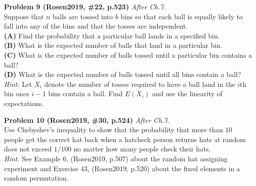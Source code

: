 \documentclass[jou]{apa6}
\begin{document}
\vspace{8pt}
{\bf Problem 9 (Rosen2019, \#22, p.523)} \textendash{} {\em After Ch.7.}\\
Suppose that $n$ balls are tossed into $b$ bins so that each 
ball is equally likely to fall into any of the bins and that the tosses are independent.\\
{\bf (A)} Find the probability that a particular ball lands in a specified bin.\\
{\bf (B)} What is the expected number of balls that land in a particular bin.\\
{\bf (C)} What is the expected number of balls tossed until a particular bin contains a ball?\\
{\bf (D)} What is the expected number of balls tossed until all bins contain a ball?\\
{\em Hint:} Let $X_i$ denote the number of tosses required to have a ball land in 
the $i$th bin once $i-1$ bins contain a ball. Find $E(X_i)$ and use the linearity of 
expectations.

\vspace{8pt}
{\bf Problem 10 (Rosen2019, \#30, p.524)} \textendash{} {\em After Ch.7.}\\
Use Chebyshev's inequality to show that the probability that more than $10$ people get the 
correct hat back when a hatcheck person returns hats at random does not exceed $1/100$
no matter how many people check their hats.\\
{\em Hint.} See Example 6, (Rosen2019, p.507) about the random hat assigning experiment 
and Exercise 43, (Rosen2019, p.520) about the fixed elements in a random permutation.
\end{document}
